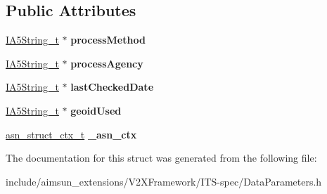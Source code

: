 \subsection*{Public Attributes}
\begin{DoxyCompactItemize}
\item 
\hyperlink{structOCTET__STRING}{I\+A5\+String\+\_\+t} $\ast$ {\bfseries process\+Method}\hypertarget{structDataParameters_ab2defd259d6ce84d452c98ecf80c7517}{}\label{structDataParameters_ab2defd259d6ce84d452c98ecf80c7517}

\item 
\hyperlink{structOCTET__STRING}{I\+A5\+String\+\_\+t} $\ast$ {\bfseries process\+Agency}\hypertarget{structDataParameters_ad3d83e6f60682837489fcccfd663d74b}{}\label{structDataParameters_ad3d83e6f60682837489fcccfd663d74b}

\item 
\hyperlink{structOCTET__STRING}{I\+A5\+String\+\_\+t} $\ast$ {\bfseries last\+Checked\+Date}\hypertarget{structDataParameters_aa1426d558e4d631988dff492a92e8f1a}{}\label{structDataParameters_aa1426d558e4d631988dff492a92e8f1a}

\item 
\hyperlink{structOCTET__STRING}{I\+A5\+String\+\_\+t} $\ast$ {\bfseries geoid\+Used}\hypertarget{structDataParameters_a254dd9abf7d5ce5881a0b3ccae1f56ac}{}\label{structDataParameters_a254dd9abf7d5ce5881a0b3ccae1f56ac}

\item 
\hyperlink{structasn__struct__ctx__s}{asn\+\_\+struct\+\_\+ctx\+\_\+t} {\bfseries \+\_\+asn\+\_\+ctx}\hypertarget{structDataParameters_ad941745c207e9fb8f67993624013bd8a}{}\label{structDataParameters_ad941745c207e9fb8f67993624013bd8a}

\end{DoxyCompactItemize}


The documentation for this struct was generated from the following file\+:\begin{DoxyCompactItemize}
\item 
include/aimsun\+\_\+extensions/\+V2\+X\+Framework/\+I\+T\+S-\/spec/Data\+Parameters.\+h\end{DoxyCompactItemize}
